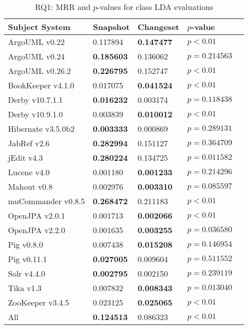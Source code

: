 
\begin{table}[t]
\renewcommand{\arraystretch}{1.3}
\footnotesize
\centering
\caption{RQ1: MRR and $p$-values for class LDA evaluations}
\begin{tabular}{l|ll|ll}
   \toprule
    Subject System & Snapshot        & Changeset       & $p$-value      \\
    \midrule

ArgoUML v0.22      & 0.117894        & {\bf 0.147477 } & $p < 0.01$     \\
ArgoUML v0.24      & {\bf 0.185603 } & 0.136062        & $p = 0.214563$ \\
ArgoUML v0.26.2    & {\bf 0.226795 } & 0.152747        & $p < 0.01$     \\
BookKeeper v4.1.0  & 0.017075        & {\bf 0.041524 } & $p < 0.01$     \\
Derby v10.7.1.1    & {\bf 0.016232 } & 0.003174        & $p = 0.118438$ \\
Derby v10.9.1.0    & 0.003839        & {\bf 0.010012 } & $p < 0.01$     \\
Hibernate v3.5.0b2 & {\bf 0.003333 } & 0.000869        & $p = 0.289131$ \\
JabRef v2.6        & {\bf 0.282994 } & 0.151127        & $p = 0.364709$ \\
jEdit v4.3         & {\bf 0.280224 } & 0.134725        & $p = 0.011582$ \\
Lucene v4.0        & 0.001180        & {\bf 0.001233 } & $p = 0.214296$ \\
Mahout v0.8        & 0.002976        & {\bf 0.003310 } & $p = 0.085597$ \\
muCommander v0.8.5 & {\bf 0.268472 } & 0.211183        & $p < 0.01$     \\
OpenJPA v2.0.1     & 0.001713        & {\bf 0.002066 } & $p < 0.01$     \\
OpenJPA v2.2.0     & 0.001635        & {\bf 0.003255 } & $p = 0.036580$ \\
Pig v0.8.0         & 0.007438        & {\bf 0.015208 } & $p = 0.146954$ \\
Pig v0.11.1        & {\bf 0.027005 } & 0.009604        & $p = 0.511552$ \\
Solr v4.4.0        & {\bf 0.002795 } & 0.002150        & $p = 0.239119$ \\
Tika v1.3          & 0.007832        & {\bf 0.008343 } & $p = 0.013040$ \\
ZooKeeper v3.4.5   & 0.023125        & {\bf 0.025065 } & $p < 0.01$     \\
\midrule
All                & {\bf 0.124513 } & 0.086323        & $p < 0.01$     \\

    \bottomrule
\end{tabular}
\label{table:rq1:class:lda}
\end{table}

